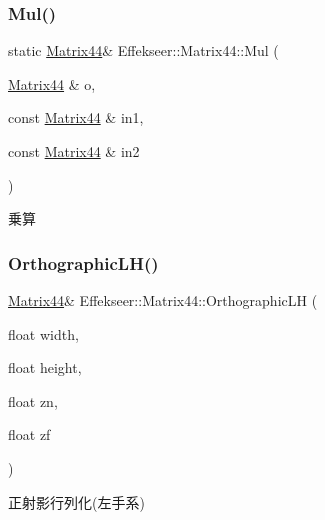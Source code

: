 \subsubsection{\texorpdfstring{Mul()}{Mul()}}
{\footnotesize\ttfamily static \mbox{\hyperlink{struct_effekseer_1_1_matrix44}{Matrix44}}\& Effekseer\+::\+Matrix44\+::\+Mul (\begin{DoxyParamCaption}\item[{\mbox{\hyperlink{struct_effekseer_1_1_matrix44}{Matrix44}} \&}]{o,  }\item[{const \mbox{\hyperlink{struct_effekseer_1_1_matrix44}{Matrix44}} \&}]{in1,  }\item[{const \mbox{\hyperlink{struct_effekseer_1_1_matrix44}{Matrix44}} \&}]{in2 }\end{DoxyParamCaption})\hspace{0.3cm}{\ttfamily [static]}}



乗算 

\mbox{\label{struct_effekseer_1_1_matrix44_a8b53aee4d2c1598cbdd64ab6a6364af2}} 
\subsubsection{\texorpdfstring{Orthographic\+L\+H()}{OrthographicLH()}}
{\footnotesize\ttfamily \mbox{\hyperlink{struct_effekseer_1_1_matrix44}{Matrix44}}\& Effekseer\+::\+Matrix44\+::\+Orthographic\+LH (\begin{DoxyParamCaption}\item[{float}]{width,  }\item[{float}]{height,  }\item[{float}]{zn,  }\item[{float}]{zf }\end{DoxyParamCaption})}



正射影行列化(左手系) 

\mbox{\label{struct_effekseer_1_1_matrix44_ac625feac179fd69f95a68d4382fa9e7a}} 
